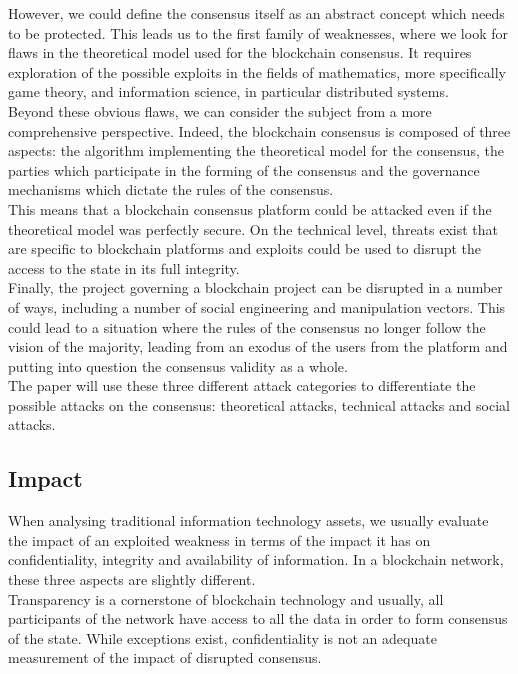 \documentclass[11pt,a4paper,draft]{article}
\begin{document}
However, we could define the consensus itself as an abstract concept which needs to be protected. This leads us to the first family of weaknesses, where we look for flaws in the theoretical model used for the blockchain consensus. It requires exploration of the possible exploits in the fields of mathematics, more specifically game theory, and information science, in particular distributed systems.\\

Beyond these obvious flaws, we can consider the subject from a more comprehensive perspective. Indeed, the blockchain consensus is composed of three aspects: the algorithm implementing the theoretical model for the consensus, the parties which participate in the forming of the consensus and the governance mechanisms which dictate the rules of the consensus.\\

This means that a blockchain consensus platform could be attacked even if the theoretical model was perfectly secure. On the technical level, threats exist that are specific to blockchain platforms and exploits could be used to disrupt the access to the state in its full integrity.\\

Finally, the project governing a blockchain project can be disrupted in a number of ways, including a number of social engineering and manipulation vectors. This could lead to a situation where the rules of the consensus no longer follow the vision of the majority, leading from an exodus of the users from the platform and putting into question the consensus validity as a whole.\\

The paper will use these three different attack categories to differentiate the possible attacks on the consensus: theoretical attacks, technical attacks and social attacks.\\

\subsection{Impact}

When analysing traditional information technology assets, we usually evaluate the impact of an exploited weakness in terms of the impact it has on confidentiality, integrity and availability of information. In a blockchain network, these three aspects are slightly different.\\

Transparency is a cornerstone of blockchain technology and usually, all participants of the network have access to all the data in order to form consensus of the state. While exceptions exist, confidentiality is not an adequate measurement of the impact of disrupted consensus.\\
\end{document}
